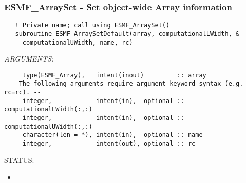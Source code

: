  
\setlength{\oldparskip}{\parskip}
\setlength{\parskip}{1.5ex}
\setlength{\oldparindent}{\parindent}
\setlength{\parindent}{0pt}
\setlength{\oldbaselineskip}{\baselineskip}
\setlength{\baselineskip}{11pt}
 
\def\bv{\begin{verbatim}}
\def\ev{\end{verbatim}}
\def\be{\begin{equation}}
\def\ee{\end{equation}}
\def\bea{\begin{eqnarray}}
\def\eea{\end{eqnarray}}
\def\bi{\begin{itemize}}
\def\ei{\end{itemize}}
\def\bn{\begin{enumerate}}
\def\en{\end{enumerate}}
\def\bd{\begin{description}}
\def\ed{\end{description}}
\def\({\left (}
\def\){\right )}
\def\[{\left [}
\def\]{\right ]}
\def\<{\left  \langle}
\def\>{\right \rangle}
\def\cI{{\cal I}}
\def\diag{\mathop{\rm diag}}
\def\tr{\mathop{\rm tr}}


 
\subsubsection [ESMF\_ArraySet] {ESMF\_ArraySet - Set object-wide Array information}


  
\begin{verbatim}   ! Private name; call using ESMF_ArraySet()
   subroutine ESMF_ArraySetDefault(array, computationalLWidth, &
     computationalUWidth, name, rc)
 \end{verbatim}{\em ARGUMENTS:}
\begin{verbatim}     type(ESMF_Array),   intent(inout)         :: array
 -- The following arguments require argument keyword syntax (e.g. rc=rc). --
     integer,            intent(in),  optional :: computationalLWidth(:,:)
     integer,            intent(in),  optional :: computationalUWidth(:,:)
     character(len = *), intent(in),  optional :: name
     integer,            intent(out), optional :: rc\end{verbatim}
{\sf STATUS:}
   \begin{itemize}
   \item{}
   \end{itemize}
  
